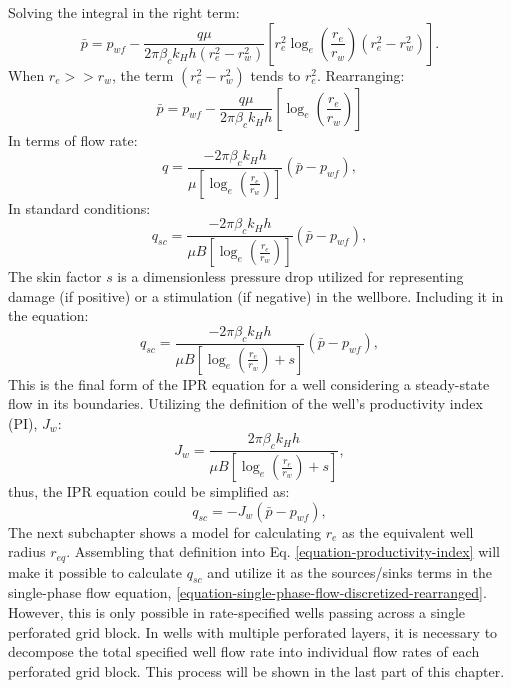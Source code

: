%
Solving the integral in the right term:
%
\begin{equation}
	\bar{p}= p_{wf} - \frac{q \mu}{2 \pi \beta_c k_H h (r_e^2-r_w^2)} \left[ r_e^2 \log_e \left(\frac{r_e}{r_w}\right) (r_e^2-r_w^2) \right].
\end{equation}
%
When $r_e >> r_w$, the term $(r_e^2-r_w^2)$ tends to $r_e^2$. 
%
Rearranging:
%
\begin{equation}
	\bar{p}=p_{wf} - \frac{q \mu}{2 \pi \beta_c k_H h}\left[ \log_e \left(\frac{r_e}{r_w}\right)\right]
\end{equation}
%
In terms of flow rate:
%
\begin{equation}
	q = \frac{- 2 \pi \beta_c k_H h}{\mu \left[ \log_e \left(\frac{r_e}{r_w}\right)\right]} (\bar{p}-p_{wf}),
\end{equation}
%
In standard conditions:
%
\begin{equation}
	q_{sc} = \frac{- 2 \pi \beta_c k_H h}{\mu B \left[ \log_e \left(\frac{r_e}{r_w}\right)\right]} (\bar{p}-p_{wf}),
\end{equation}
%
The skin factor $s$ is a dimensionless pressure drop utilized for representing damage (if positive) or a stimulation (if negative) in the wellbore.
%
Including it in the equation:
%
\begin{equation}
	\label{equation-inflow-performance-relationship}
	q_{sc} = \frac{- 2 \pi \beta_c k_H h}{\mu B \left[ \log_e \left(\frac{r_e}{r_w}\right) + s\right]} (\bar{p}-p_{wf}),
\end{equation}
%
This is the final form of the IPR equation for a well considering a steady-state flow in its boundaries.
%
Utilizing the definition of the well's productivity index (PI), $J_w$:
%
\begin{equation}
	\label{equation-productivity-index}
	J_w = \frac{ 2 \pi \beta_c k_H h}{\mu B\left[ \log_e \left(\frac{r_e}{r_w}\right) + s\right]},
\end{equation}
%
%
thus, the IPR equation could be simplified as:
%
\begin{equation}
	q_{sc} = - J_w \left( \bar{p}-p_{wf} \right),
\end{equation}
%
The next subchapter shows a model for calculating $r_e$ as the equivalent well radius $r_{eq}$.
%
Assembling that definition into Eq. \ref{equation-productivity-index} will make it possible to calculate $q_{sc}$ and utilize it as the sources/sinks terms in the single-phase flow equation, \ref{equation-single-phase-flow-discretized-rearranged}.
%
However, this is only possible in rate-specified wells passing across a single perforated grid block.
%
In wells with multiple perforated layers, it is necessary to decompose the total specified well flow rate into individual flow rates of each perforated grid block.
%
This process will be shown in the last part of this chapter.

